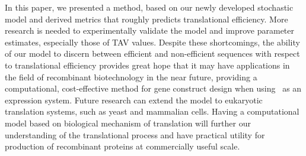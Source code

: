 \documentclass[12pt]{article}
\begin{document}
In this paper, we presented a method, based on our newly
developed stochastic model and derived metrics that roughly predicts
translational efficiency.  More research is needed to
experimentally validate the model and improve parameter
estimates, especially those of TAV values. Despite these
shortcomings, the ability of our model to discern between efficient
and non-efficient sequences with respect to translational efficiency
provides great hope that it may have applications in the field of
recombinant biotechnology in the near future, providing a
computational, cost-effective method for gene construct
design when using \ecoli\ as an expression system.  Future research
can extend the model to eukaryotic translation systems, such as yeast
and mammalian cells.  Having a computational model based on biological
mechanism of translation will further our understanding of the
translational process and have practical utility for production of
recombinant proteins at commercially useful scale.

{}
\begin{singlespace}  \end{singlespace}
\end{document}
